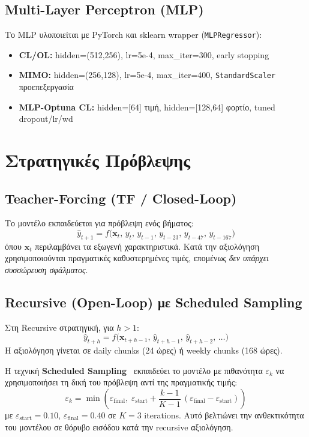 \subsection{Multi-Layer Perceptron (MLP)}

Το MLP υλοποιείται με PyTorch και sklearn wrapper (\texttt{MLPRegressor}):
\begin{itemize}
    \item \textbf{CL/OL:} hidden=(512,256), lr=5e-4, max\_iter=300, early stopping
    \item \textbf{MIMO:} hidden=(256,128), lr=5e-4, max\_iter=400, \texttt{StandardScaler} προεπεξεργασία
    \item \textbf{MLP-Optuna CL:} hidden=[64] τιμή, hidden=[128,64] φορτίο, tuned dropout/lr/wd
\end{itemize}


\section{Στρατηγικές Πρόβλεψης}
\label{sec:strategies}

\subsection{Teacher-Forcing (TF / Closed-Loop)}

Το μοντέλο εκπαιδεύεται για πρόβλεψη ενός βήματος:
\begin{equation}
    \hat{y}_{t+1} = f\bigl(\mathbf{x}_t,\, y_t,\, y_{t-1},\, y_{t-23},\, y_{t-47},\, y_{t-167}\bigr)
\end{equation}
όπου $\mathbf{x}_t$ περιλαμβάνει τα εξωγενή χαρακτηριστικά. Κατά την αξιολόγηση χρησιμοποιούνται
πραγματικές καθυστερημένες τιμές, επομένως \textit{δεν υπάρχει συσσώρευση σφάλματος}.

\subsection{Recursive (Open-Loop) με Scheduled Sampling}

Στη Recursive στρατηγική, για $h > 1$:
\begin{equation}
    \hat{y}_{t+h} = f\bigl(\mathbf{x}_{t+h-1},\, \hat{y}_{t+h-1},\, \hat{y}_{t+h-2},\, \ldots\bigr)
\end{equation}
Η αξιολόγηση γίνεται σε daily chunks (24 ώρες) ή weekly chunks (168 ώρες).

Η τεχνική \textbf{Scheduled Sampling}~\cite{bengio2015scheduled} εκπαιδεύει το μοντέλο με
πιθανότητα $\varepsilon_k$ να χρησιμοποιήσει τη δική του πρόβλεψη αντί της πραγματικής τιμής:
\begin{equation}
    \varepsilon_k = \min\!\left(\varepsilon_{\text{final}},\; \varepsilon_{\text{start}} +
    \frac{k-1}{K-1}\,(\varepsilon_{\text{final}} - \varepsilon_{\text{start}})\right)
\end{equation}
με $\varepsilon_{\text{start}}=0.10$, $\varepsilon_{\text{final}}=0.40$ σε $K=3$ iterations. Αυτό
βελτιώνει την ανθεκτικότητα του μοντέλου σε θόρυβο εισόδου κατά την recursive αξιολόγηση.

